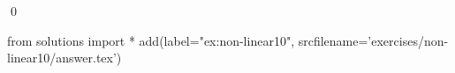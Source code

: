 
\begin{ex} 
  \label{ex:non-linear10}
  
  \qed
\end{ex} 
\begin{python0}
from solutions import *
add(label="ex:non-linear10",
    srcfilename='exercises/non-linear10/answer.tex') 
\end{python0}
